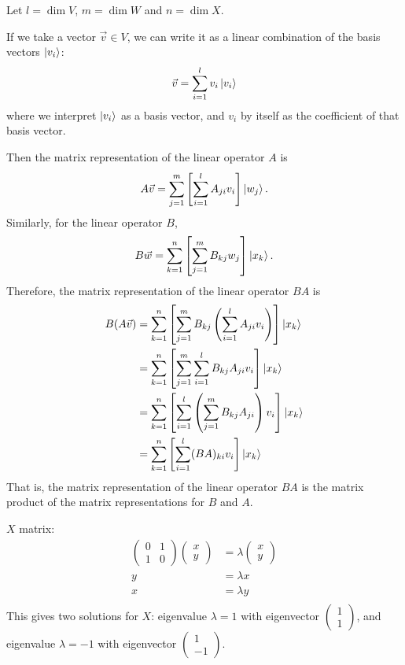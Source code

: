 \documentclass[12pt]{extarticle}
\begin{document}
Let $l=\dim V$, $m=\dim W$ and $n=\dim X$.

If we take a vector $\vec{v}\in V$, we can write it as a linear combination of the basis vectors $\ket{v_i}$:
\[
\vec{v} = \sum_{i=1}^l v_i \ket{v_i}
\]
where we interpret $\ket{v_i}$ as a basis vector, and $v_i$ by itself as the coefficient of that basis vector.

Then the matrix representation of the linear operator $A$ is
\[
A\vec{v} = \sum_{j=1}^m \left[\sum_{i=1}^l A_{ji} v_i\right] \ket{w_j}.
\]
Similarly, for the linear operator $B$,
\[
B\vec{w} = \sum_{k=1}^n \left[\sum_{j=1}^m B_{kj} w_j\right] \ket{x_k}.
\]
Therefore, the matrix representation of the linear operator $BA$ is
\begin{align*}
B(A\vec{v}) & = \sum_{k=1}^n \left[\sum_{j=1}^m B_{kj} \left(\sum_{i=1}^l A_{ji} v_i\right)\right] \ket{x_k} \\
& = \sum_{k=1}^n \left[\sum_{j=1}^m \sum_{i=1}^l B_{kj} A_{ji} v_i\right] \ket{x_k} \\
& = \sum_{k=1}^n \left[\sum_{i=1}^l \left(\sum_{j=1}^m B_{kj} A_{ji}\right) v_i\right] \ket{x_k} \\
& = \sum_{k=1}^n \left[\sum_{i=1}^l (BA)_{ki} v_i\right] \ket{x_k} \\
\end{align*}
That is, the matrix representation of the linear operator $BA$ is the matrix product of the matrix representations for $B$ and $A$.


$X$ matrix:
\begin{align*}
\begin{pmatrix} 0 & 1 \\ 1 & 0 \end{pmatrix} \begin{pmatrix} x \\ y \end{pmatrix} & = \lambda \begin{pmatrix} x \\ y \end{pmatrix} \\
y & = \lambda x \\
x & = \lambda y \\
\end{align*}
This gives two solutions for $X$: eigenvalue $\lambda=1$ with eigenvector $\begin{pmatrix} 1 \\ 1 \end{pmatrix}$, and eigenvalue $\lambda=-1$ with eigenvector $\begin{pmatrix} 1 \\ -1 \end{pmatrix}$.
\end{document}
